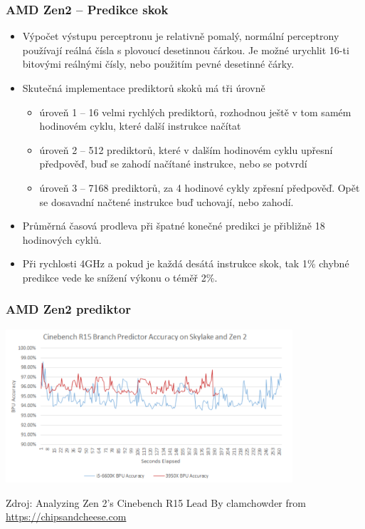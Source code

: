 \documentclass{beamer}
\begin{document}
\begin{frame}
\frametitle{AMD Zen2 -- Predikce skok}

\begin{itemize}
\item Výpočet výstupu perceptronu je relativně pomalý, normální perceptrony používají reálná čísla s plovoucí desetinnou čárkou. Je možné urychlit 16-ti bitovými reálnými čísly, nebo použitím pevné desetinné čárky.
\item Skutečná implementace prediktorů skoků má tři úrovně
\begin{itemize}
\item úroveň 1 -- 16 velmi rychlých prediktorů, rozhodnou ještě v tom samém hodinovém cyklu, které další instrukce načítat
\item úroveň 2 -- 512 prediktorů, které v dalším hodinovém cyklu upřesní předpověď, buď se zahodí načítané instrukce, nebo se potvrdí
\item úroveň 3 -- 7168 prediktorů, za 4 hodinové cykly zpřesní předpověď. Opět se dosavadní načtené instrukce buď uchovají, nebo zahodí.
\end{itemize}
\item Průměrná časová prodleva při špatné konečné predikci je přibližně 18 hodinových cyklů.
\item Při rychlosti 4GHz a pokud je každá desátá instrukce skok, tak 1\% chybné predikce vede ke snížení výkonu o téměř 2\%.
\end{itemize}
\end{frame}


\begin{frame}
\frametitle{AMD Zen2 prediktor}

\begin{center}
\includegraphics[width=0.8\textwidth]{fig/amd_cinebench.png}
\end{center}

Zdroj: Analyzing Zen 2’s Cinebench R15 Lead
By clamchowder from \url{https://chipsandcheese.com}
\end{frame}
\end{document}
